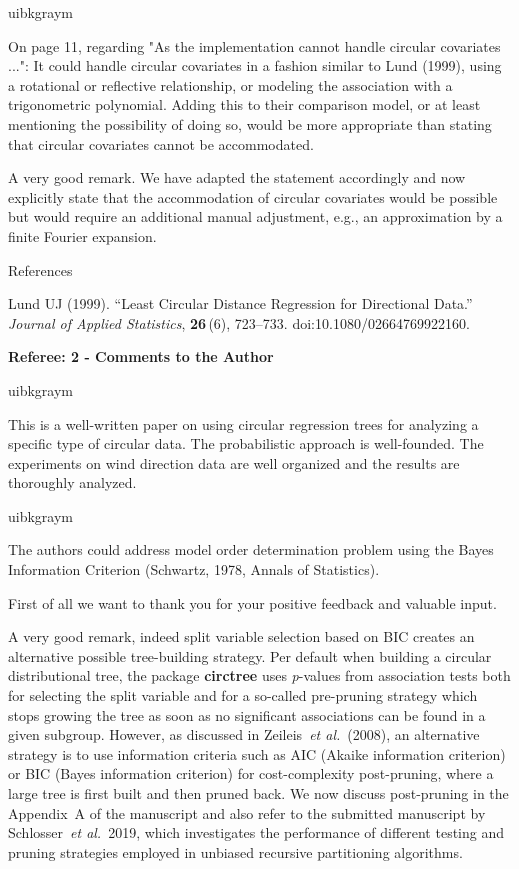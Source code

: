\documentclass[english, noconfig]{uibklttr}
\newcommand{\section}[1]{{\Large{\textbf{#1}}}}
\newenvironment{re}{
    \begin{color}{uibkgraym}
        \itshape
}{
    \end{color}
}
\begin{document}
\vspace{0.5em}
\begin{re}
On page 11, regarding "As the implementation cannot handle circular
covariates ...": It could handle circular covariates in a fashion similar to
Lund (1999), using a rotational or reflective relationship, or modeling the
association with a trigonometric polynomial. Adding this to their comparison
model, or at least mentioning the possibility of doing so, would be more
appropriate than stating that circular covariates cannot be accommodated.
\end{re}

A very good remark. We have adapted the statement accordingly and now
explicitly state that the accommodation of circular covariates would be
possible but would require an additional manual adjustment, e.g., an approximation by
a finite Fourier expansion.

\vspace{0.5cm}
References

Lund UJ (1999). ``Least Circular Distance Regression for Directional Data.''
\emph{Journal of Applied Statistics}, \textbf{26}\,(6), 723--733.
doi:10.1080/02664769922160.

\newpage

\section{Referee: 2 - Comments to the Author}

\begin{re}
This is a well-written paper on using circular regression trees for analyzing a
specific type of circular data. The probabilistic approach is well-founded. The
experiments on wind direction data are well organized and the results are
thoroughly analyzed.
\end{re}

\begin{re}
The authors could address model order determination problem using the
Bayes Information Criterion (Schwartz, 1978, Annals of Statistics).  
\end{re}

First of all we want to thank you for your positive feedback and valuable input. 

A very good remark, indeed split variable selection based on BIC creates an
alternative possible tree-building strategy. Per default when building a
circular distributional tree, the package \textbf{circtree} uses
\emph{p}-values from association tests both for selecting the split variable
and for a so-called pre-pruning strategy which stops growing the tree as soon
as no significant associations can be found in a given subgroup. However, as
discussed in Zeileis~\emph{et al.}~(2008), an alternative strategy is to use
information criteria such as AIC (Akaike information criterion) or BIC (Bayes
information criterion) for cost-complexity post-pruning, where a large tree is
first built and then pruned back. We now discuss post-pruning in the Appendix~A
of the manuscript and also refer to the submitted manuscript by
Schlosser~\emph{et al.}~2019, which investigates the performance of different
testing and pruning strategies employed in unbiased recursive partitioning
algorithms.
\end{document}
